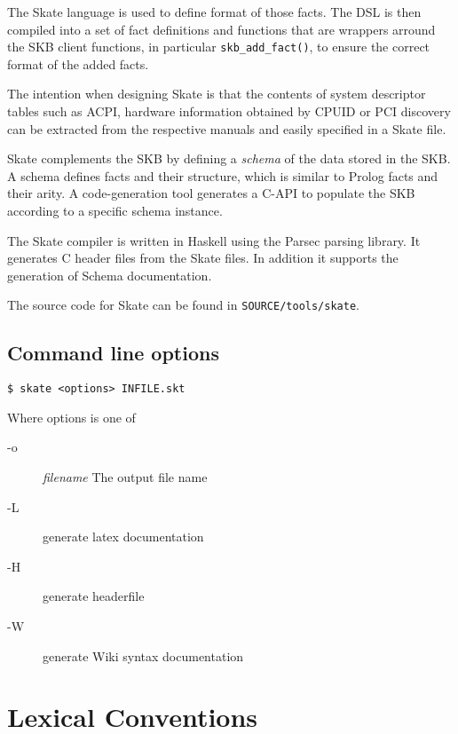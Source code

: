 \documentclass[a4paper,11pt,twoside]{report}
\begin{document}
{{The Skate language is used to define format of those facts. The DSL is then 
compiled into a set of fact definitions and functions that are wrappers arround
the SKB client functions, in particular \texttt{skb\_add\_fact()}, to ensure
the correct format of the added facts.  

The intention when designing Skate is that the contents of system descriptor
tables such as ACPI, hardware information obtained by CPUID or PCI discovery
can be extracted from the respective manuals and easily specified in a Skate 
file. 

Skate complements the SKB by defining a \emph{schema} of the data stored in
the SKB. A schema defines facts and their structure, which is similar to Prolog
facts and their arity. A code-generation tool generates a C-API to populate the
SKB according to a specific schema instance.

The Skate compiler is written in Haskell using the Parsec parsing library. It
generates C header files from the Skate files. In addition it supports the 
generation of Schema documentation.

The source code for Skate can be found in \texttt{SOURCE/tools/skate}.


\section{Command line options}
\label{sec:cmdline}

\begin{verbatim}
$ skate <options> INFILE.skt
\end{verbatim}


Where options is one of
\begin{description}
  \item[-o] \textit{filename} The output file name
  \item[-L] generate latex documentation
  \item[-H] generate headerfile
  \item[-W] generate Wiki syntax documentation
\end{description}



\chapter{Lexical Conventions}
\label{chap:lexer}

}}
\end{document}
